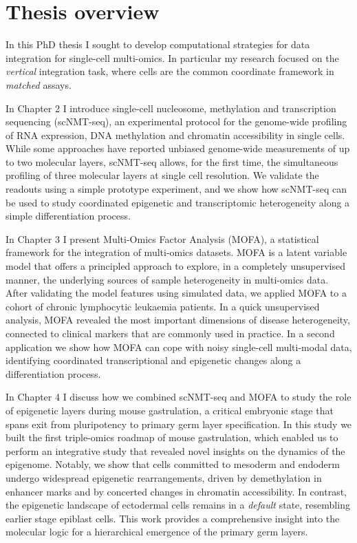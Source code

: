 \section{Thesis overview}

In this PhD thesis I sought to develop computational strategies for data integration for single-cell multi-omics. In particular my research focused on the \textit{vertical} integration task, where cells are the common coordinate framework in \textit{matched} assays.

In Chapter 2 I introduce single-cell nucleosome, methylation and transcription sequencing (scNMT-seq), an experimental protocol for the genome-wide profiling of RNA expression, DNA methylation and chromatin accessibility in single cells. While some approaches have reported unbiased genome-wide measurements of up to two molecular layers, scNMT-seq allows, for the first time, the simultaneous profiling of three molecular layers at single cell resolution. We validate the readouts using a simple prototype experiment, and we show how scNMT-seq can be used to study coordinated epigenetic and transcriptomic heterogeneity along a simple differentiation process.

In Chapter 3 I present Multi-Omics Factor Analysis (MOFA), a statistical framework for the integration of multi-omics datasets. MOFA is a latent variable model that offers a principled approach to explore, in a completely unsupervised manner, the underlying sources of sample heterogeneity in multi-omics data. After validating the model features using simulated data, we applied MOFA to a cohort of chronic lymphocytic leukaemia patients. In a quick unsupervised analysis, MOFA revealed the most important dimensions of disease heterogeneity, connected to clinical markers that are commonly used in practice. In a second application we show how MOFA can cope with noisy single-cell multi-modal data, identifying coordinated transcriptional and epigenetic changes along a differentiation process.

In Chapter 4 I discuss how we combined scNMT-seq and MOFA to study the role of epigenetic layers during mouse gastrulation, a critical embryonic stage that spans exit from pluripotency to primary germ layer specification. In this study we built the first triple-omics roadmap of mouse gastrulation, which enabled us to perform an integrative study that revealed novel insights on the dynamics of the epigenome. Notably, we show that cells committed to mesoderm and endoderm undergo widespread epigenetic rearrangements, driven by demethylation in enhancer marks and by concerted changes in chromatin accessibility. In contrast, the epigenetic landscape of ectodermal cells remains in a \textit{default} state, resembling earlier stage epiblast cells. This work provides a comprehensive insight into the molecular logic for a hierarchical emergence of the primary germ layers.

